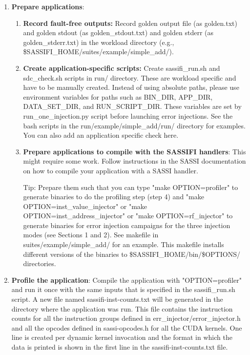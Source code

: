 \begin{enumerate}
\item {\bf Prepare applications}:
		\begin{enumerate}

			\item {\bf Record fault-free outputs:} Record golden output file (as
			golden.txt) and golden stdout (as golden\_stdout.txt) and golden stderr
			(as golden\_stderr.txt) in the workload directory (e.g.,
			\$SASSIFI\_HOME/suites/example/simple\_add/).
			\label{step41}

			\item {\bf Create application-specific scripts:} Create sassifi\_run.sh
			and sdc\_check.sh scripts in run/ directory.  These are workload specific
			and have to be manually created. Instead of using absolute paths, please
			use environment variables for paths such as BIN\_DIR, APP\_DIR,
			DATA\_SET\_DIR, and RUN\_SCRIPT\_DIR. These variables are set by
			run\_one\_injection.py script before launching error injections. See
			the bash scripts in the run/example/simple\_add/run/ directory for
			examples. You can also add an application specific check here. 
			\label{step42}

			\item {\bf Prepare applications to compile with the SASSIFI handlers}:
			This might require some work. Follow instructions in the SASSI
			documentation on how to compile your application with a SASSI handler.
			
			Tip: Prepare them such that you can type "make OPTION=profiler" to
			generate binaries to do the profiling step (step 4) and "make
			OPTION=inst\_value\_injector"  or "make OPTION=inst\_address\_injector" 
			or "make OPTION=rf\_injector" to generate
			binaries for error injection campaigns for the three injection modes (see
			Sections 1 and 2). See makefile in suites/example/simple\_add/ for an
			example. This makefile installs different versions of the binaries to 
			\$SASSIFI\_HOME/bin/\$OPTIONS/ directories. 
			\label{step43}

			\end{enumerate}

\item {\bf Profile the application}:
		Compile the application with "OPTION=profiler" and run it once with the
		same inputs that is specified in the sassifi\_run.sh script. A new file
		named sassifi-inst-counts.txt will be generated in the directory where the
		application was run. This file contains the instruction counts for all the
		instruction groups defined in err\_injector/error\_injector.h and all the
		opcodes defined in sassi-opcodes.h for all the CUDA kernels. One line is
		created per dynamic kernel invocation and the format in which the data is
		printed is shown in the first line in the sassifi-inst-counts.txt file. 
\label{step5}


\end{enumerate}
